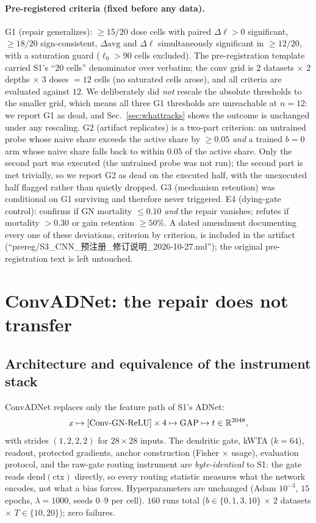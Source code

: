 \documentclass[review]{elsarticle}
\begin{document}
\paragraph{Pre-registered criteria (fixed before any data).}
G1 (repair generalizes): $\ge 15/20$ dose cells with paired
$\Delta\ell > 0$ significant, $\ge 18/20$ sign-consistent, $\Delta\mathrm{avg}$
and $\Delta\ell$ simultaneously significant in $\ge 12/20$, with a
saturation guard ($\ell_0 > 90$ cells excluded). The pre-registration
template carried S1's ``$20$ cells'' denominator over verbatim; the
conv grid is $2$ datasets $\times$ $2$ depths $\times$ $3$ doses
$= 12$ cells (no saturated cells arose), and all criteria are
evaluated against $12$. We deliberately did \emph{not} rescale the
absolute thresholds to the smaller grid, which means all three G1
thresholds are unreachable at $n{=}12$: we report G1 as dead, and
Sec.~\ref{sec:whattracks} shows the outcome is unchanged under any
rescaling. G2 (artifact replicates) is a two-part criterion: an
untrained probe whose naive share exceeds the active share by
$\ge 0.05$ \emph{and} a trained $b{=}0$ arm whose naive share falls
back to within $0.05$ of the active share. Only the second part was
executed (the untrained probe was not run); the second part is met
trivially, so we report G2 as dead on the executed half, with the
unexecuted half flagged rather than quietly dropped. G3 (mechanism
retention) was conditional on G1 surviving and therefore never
triggered. E4 (dying-gate control): confirms if GN mortality
$\le 0.10$ \emph{and} the repair vanishes; refutes if mortality
$> 0.30$ or gain retention $\ge 50\%$. A dated amendment documenting
every one of these deviations, criterion by criterion, is included in
the artifact (``prereg/S3\_CNN\_预注册\_修订说明\_2026-10-27.md''); the
original pre-registration text is left untouched.

\section{ConvADNet: the repair does not transfer}
\label{sec:conv}

\subsection{Architecture and equivalence of the instrument stack}

ConvADNet replaces only the feature path of S1's ADNet:
\[
x \mapsto [\mathrm{Conv}{\text -}\mathrm{GN}{\text -}\mathrm{ReLU}]
\times 4 \mapsto \mathrm{GAP} \mapsto t \in \mathbb{R}^{2048},
\]
with strides $(1,2,2,2)$ for $28{\times}28$ inputs. The dendritic
gate, kWTA ($k{=}64$), readout, protected gradients, anchor
construction (Fisher $\times$ usage), evaluation protocol, and the
raw-gate routing instrument are \emph{byte-identical} to S1: the gate
reads $\mathrm{dend}(\mathrm{ctx})$ directly, so every routing
statistic measures what the network encodes, not what a bias forces.
Hyperparameters are unchanged (Adam $10^{-3}$, $15$ epochs,
$\lambda{=}1000$, seeds $0$--$9$ per cell). $160$ runs total
($b \in \{0,1,3,10\}$ $\times$ $2$ datasets $\times$ $T \in
\{10,20\}$); zero failures.
\end{document}
